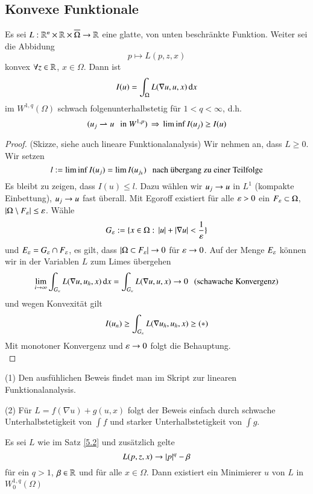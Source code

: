 \subsection*{Konvexe Funktionale}

\begin{theorem}\label{5.2}
    Es sei $L:\mathbb{R}^n\times \mathbb{R}\times \overline\Omega\rightarrow \mathbb{R}$ eine glatte, von unten beschränkte Funktion. Weiter
    sei die Abbidung
    \[
        p\mapsto L(p,z,x)
    \]
    konvex $\forall z \in \mathbb{R}$, $x\in \Omega$. Dann ist
    \[
        I(u)=\int_\Omega L(\nabla u, u, x ) \, \mathrm{d} x
    \]
    im $W^{1,q}(\Omega)$ schwach folgenunterhalbstetig für $1<q<\infty$, d.h.
    \[
        (u_j\rightharpoonup u \hspace{.25cm} \text{in $W^{1,p}$}) \, \Rightarrow \, \liminf I(u_j)\geq I(u)
    \]
\end{theorem}

\begin{proof}
(Skizze, siehe auch lineare Funktionalanalysis) Wir nehmen an, dass $L\geq 0$. Wir setzen
\[
    l:= \liminf I(u_j)=\lim I(u_{j_k}) \hspace{.25cm}\text{nach übergang zu einer Teilfolge}
\]
Es bleibt zu zeigen, dass $I(u)\leq l$. Dazu wählen wir $u_j\rightarrow u$ in $L^1$ (kompakte Einbettung),
$u_j\rightarrow u$ fast überall. Mit Egoroff existiert für alle $\varepsilon>0$ ein $F_\varepsilon\subset \Omega$, 
$|\Omega\setminus F_\varepsilon|\leq \varepsilon$. Wähle
\[
    G_\varepsilon := \{x\in\Omega:\, |u|+|\nabla u|<\frac1{\varepsilon}\}
\]
und $E_\varepsilon=G_\varepsilon\cap F_\varepsilon$, es gilt, dass $|\Omega\subset F_\varepsilon|\rightarrow 0$ für
$\varepsilon \rightarrow 0$. Auf der Menge $E_\varepsilon$ können wir in der Variablen $L$ zum Limes übergehen
\[
    \lim_{i\rightarrow \infty} \int_{G_\varepsilon} L(\nabla u, u_h,x) \, \mathrm{d} x = \int_{G_\varepsilon} L(\nabla u, u ,x)
    \rightarrow 0 \hspace{.25cm} (\text{schawache Konvergenz})
\]
und wegen Konvexität gilt
\[
    I(u_n)\geq \int_{G_\varepsilon} L(\nabla u_h,u_h,x)\geq (*)
\]
Mit monotoner Konvergenz und $\varepsilon \rightarrow 0$ folgt die Behauptung.\[ \]
\end{proof}

\begin{remark}
\begin{description}
    \item{(1)} Den ausfühlichen Beweis findet man im Skript zur linearen Funktionalanalysis.
    \item{(2)} Für $L=f(\nabla u) + g(u,x)$ folgt der Beweis einfach durch schwache Unterhalbstetigkeit
    von $\int f$ und starker Unterhalbstetigkeit von $\int g$.
\end{description}
\end{remark}
\begin{theorem} \label{5.3}
Es sei $L$ wie im Satz \ref{5.2} und zusätzlich gelte
\[
    L(p,z,x) \rightarrow |p|^q-\beta
\]
für ein $q>1$, $\beta\in \mathbb{R}$ und für alle $x\in \Omega.$
Dann existiert ein Minimierer $u$ von $L$ in $W_0^{1,q}(\Omega)$

\end{theorem}


